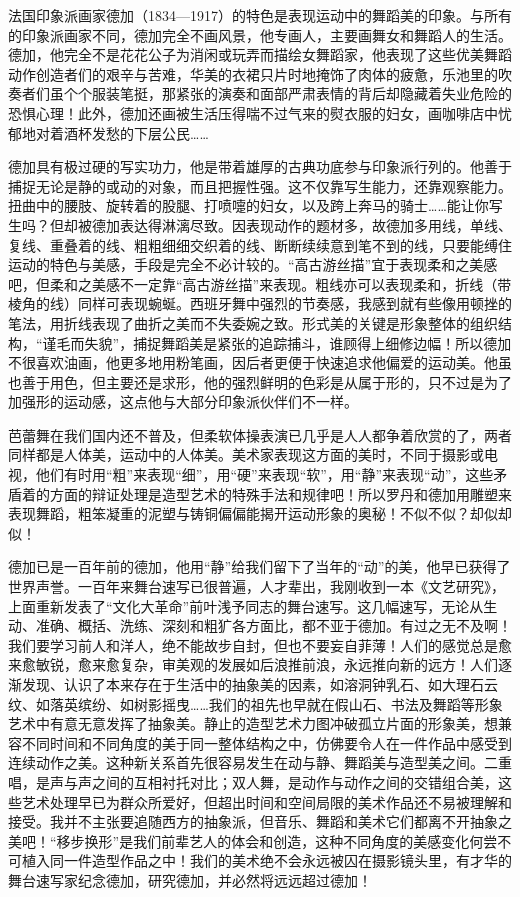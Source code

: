 \documentclass{article}
\begin{document}
法国印象派画家德加（1834—1917）的特色是表现运动中的舞蹈美的印象。与所有的印象派画家不同，德加完全不画风景，他专画人，主要画舞女和舞蹈人的生活。德加，他完全不是花花公子为消闲或玩弄而描绘女舞蹈家，他表现了这些优美舞蹈动作创造者们的艰辛与苦难，华美的衣裙只片时地掩饰了肉体的疲惫，乐池里的吹奏者们虽个个服装笔挺，那紧张的演奏和面部严肃表情的背后却隐藏着失业危险的恐惧心理！此外，德加还画被生活压得喘不过气来的熨衣服的妇女，画咖啡店中忧郁地对着酒杯发愁的下层公民……

德加具有极过硬的写实功力，他是带着雄厚的古典功底参与印象派行列的。他善于捕捉无论是静的或动的对象，而且把握性强。这不仅靠写生能力，还靠观察能力。扭曲中的腰肢、旋转着的股腿、打喷嚏的妇女，以及跨上奔马的骑士……能让你写生吗？但却被德加表达得淋漓尽致。因表现动作的题材多，故德加多用线，单线、复线、重叠着的线、粗粗细细交织着的线、断断续续意到笔不到的线，只要能缚住运动的特色与美感，手段是完全不必计较的。“高古游丝描”宜于表现柔和之美感吧，但柔和之美感不一定靠“高古游丝描”来表现。粗线亦可以表现柔和，折线（带棱角的线）同样可表现蜿蜒。西班牙舞中强烈的节奏感，我感到就有些像用顿挫的笔法，用折线表现了曲折之美而不失委婉之致。形式美的关键是形象整体的组织结构，“谨毛而失貌”，捕捉舞蹈美是紧张的追踪捕斗，谁顾得上细修边幅！所以德加不很喜欢油画，他更多地用粉笔画，因后者更便于快速追求他偏爱的运动美。他虽也善于用色，但主要还是求形，他的强烈鲜明的色彩是从属于形的，只不过是为了加强形的运动感，这点他与大部分印象派伙伴们不一样。

芭蕾舞在我们国内还不普及，但柔软体操表演已几乎是人人都争着欣赏的了，两者同样都是人体美，运动中的人体美。美术家表现这方面的美时，不同于摄影或电视，他们有时用“粗”来表现“细”，用“硬”来表现“软”，用“静”来表现“动”，这些矛盾着的方面的辩证处理是造型艺术的特殊手法和规律吧！所以罗丹和德加用雕塑来表现舞蹈，粗笨凝重的泥塑与铸铜偏偏能揭开运动形象的奥秘！不似不似？却似却似！

德加已是一百年前的德加，他用“静”给我们留下了当年的“动”的美，他早已获得了世界声誉。一百年来舞台速写已很普遍，人才辈出，我刚收到一本《文艺研究》，上面重新发表了“文化大革命”前叶浅予同志的舞台速写。这几幅速写，无论从生动、准确、概括、洗练、深刻和粗犷各方面比，都不亚于德加。有过之无不及啊！我们要学习前人和洋人，绝不能故步自封，但也不要妄自菲薄！人们的感觉总是愈来愈敏锐，愈来愈复杂，审美观的发展如后浪推前浪，永远推向新的远方！人们逐渐发现、认识了本来存在于生活中的抽象美的因素，如溶洞钟乳石、如大理石云纹、如落英缤纷、如树影摇曳……我们的祖先也早就在假山石、书法及舞蹈等形象艺术中有意无意发挥了抽象美。静止的造型艺术力图冲破孤立片面的形象美，想兼容不同时间和不同角度的美于同一整体结构之中，仿佛要令人在一件作品中感受到连续动作之美。这种新关系首先很容易发生在动与静、舞蹈美与造型美之间。二重唱，是声与声之间的互相衬托对比；双人舞，是动作与动作之间的交错组合美，这些艺术处理早已为群众所爱好，但超出时间和空间局限的美术作品还不易被理解和接受。我并不主张要追随西方的抽象派，但音乐、舞蹈和美术它们都离不开抽象之美吧！“移步换形”是我们前辈艺人的体会和创造，这种不同角度的美感变化何尝不可植入同一件造型作品之中！我们的美术绝不会永远被囚在摄影镜头里，有才华的舞台速写家纪念德加，研究德加，并必然将远远超过德加！
\end{document}
